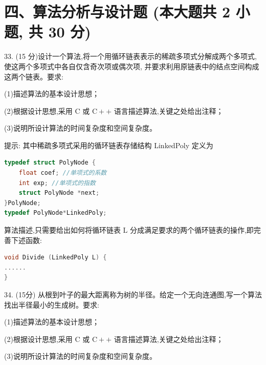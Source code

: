 \section*{四、算法分析与设计题 (本大题共 2 小题, 共 30 分)}

33. (15 分)设计一个算法,将一个用循环链表表示的稀疏多项式分解成两个多项式,使这两个多项式中各自仅含奇次项或偶次项, 并要求利用原链表中的结点空间构成这两个链表。要求:

(1)描述算法的基本设计思想；

(2)根据设计思想,采用 \(\mathrm{C}\) 或 \(\mathrm{C} +  +\) 语言描述算法,关键之处给出注释；

(3)说明所设计算法的时间复杂度和空间复杂度。
\vspace{6em}

提示: 其中稀疏多项式采用的循环链表存储结构 LinkedPoly 定义为
\begin{lstlisting}[language=C, basicstyle=\ttfamily]
typedef struct PolyNode {
    float coef; //单项式的系数
    int exp; //单项式的指数
    struct PolyNode *next;
}PolyNode;
typedef PolyNode*LinkedPoly;
\end{lstlisting}

算法描述,只需要给出如何将循环链表 \(\mathrm{L}\) 分成满足要求的两个循环链表的操作,即完善下述函数: 
\begin{lstlisting}[language=C, basicstyle=\ttfamily]
void Divide (LinkedPoly L) {
......
}
\end{lstlisting}
\vspace{20em}


34. (15分) 从根到叶子的最大距离称为树的半径。给定一个无向连通图,写一个算法找出半径最小的生成树。要求:

(1)描述算法的基本设计思想；

(2)根据设计思想,采用 \(\mathrm{C}\) 或 \(\mathrm{C} +  +\) 语言描述算法,关键之处给出注释；

(3)说明所设计算法的时间复杂度和空间复杂度。